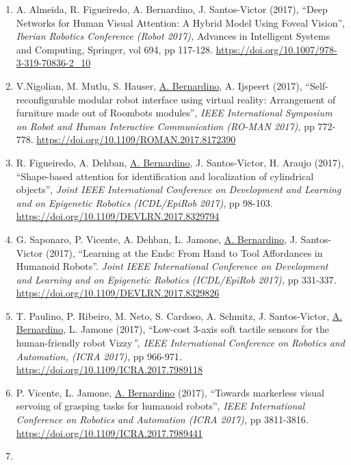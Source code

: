 \begin{enumerate}
  Augmented Reality Gaming Platform for Active Aging in Elderly
  Institutions'', \emph{International Congress on Sport Sciences
  Research and Technology Support (icSPORTS 2017),} pp 1-12.
  \url{https://doi.org/10.5220/0006606601510162}~
\item
  A. Almeida, R. Figueiredo, A. Bernardino, J. Santos-Victor (2017),
  ``Deep Networks for Human Visual Attention: A Hybrid Model Using
  Foveal Vision'', \emph{Iberian Robotics Conference (Robot 2017),}
  Advances in Intelligent Systems and Computing, Springer, vol 694, pp
  117-128. \url{https://doi.org/10.1007/978-3-319-70836-2_10}~
\item
  V.Nigolian, M. Mutlu, S. Hauser, \ul{A. Bernardino}, A. Ijspeert
  (2017), ``Self-reconfigurable modular robot interface using virtual
  reality: Arrangement of furniture made out of Roombots modules'',
  \emph{IEEE International Symposium on Robot and Human Interactive
  Communication (RO-MAN 2017),} pp 772-778.
  \url{https://doi.org/10.1109/ROMAN.2017.8172390}~~
\item
  R. Figueiredo, A. Dehban, \ul{A. Bernardino}, J. Santos-Victor, H.
  Araujo (2017), ``Shape-based attention for identification and
  localization of cylindrical objects'', \emph{Joint IEEE International
  Conference on Development and Learning and on Epigenetic Robotics
  (ICDL/EpiRob 2017)}, pp 98-103.
  \url{https://doi.org/10.1109/DEVLRN.2017.8329794}~
\item
  G. Saponaro, P. Vicente, A. Dehban, L. Jamone, \ul{A. Bernardino}, J.
  Santos-Victor (2017), ``Learning at the Ends: From Hand to Tool
  Affordances in Humanoid Robots''. \emph{Joint IEEE International
  Conference on Development and Learning and on Epigenetic Robotics
  (ICDL/EpiRob 2017),} pp 331-337\emph{.}
  \url{https://doi.org/10.1109/DEVLRN.2017.8329826}~
\item
  T. Paulino, P. Ribeiro, M. Neto, S. Cardoso, A. Schmitz, J.
  Santos-Victor, \ul{A. Bernardino}, L. Jamone (2017), ``Low-cost 3-axis
  soft tactile sensors for the human-friendly robot Vizzy\emph{'', IEEE
  International Conference on Robotics and Automation, (ICRA 2017),} pp
  966-971\emph{.} \url{https://doi.org/10.1109/ICRA.2017.7989118}~
\item
  P. Vicente, L. Jamone, \ul{A. Bernardino} (2017), ``Towards markerless
  visual servoing of grasping tasks for humanoid robots'', \emph{IEEE
  International Conference on Robotics and Automation (ICRA 2017),} pp
  3811-3816\emph{.} \url{https://doi.org/10.1109/ICRA.2017.7989441}~
\item

\end{enumerate}
